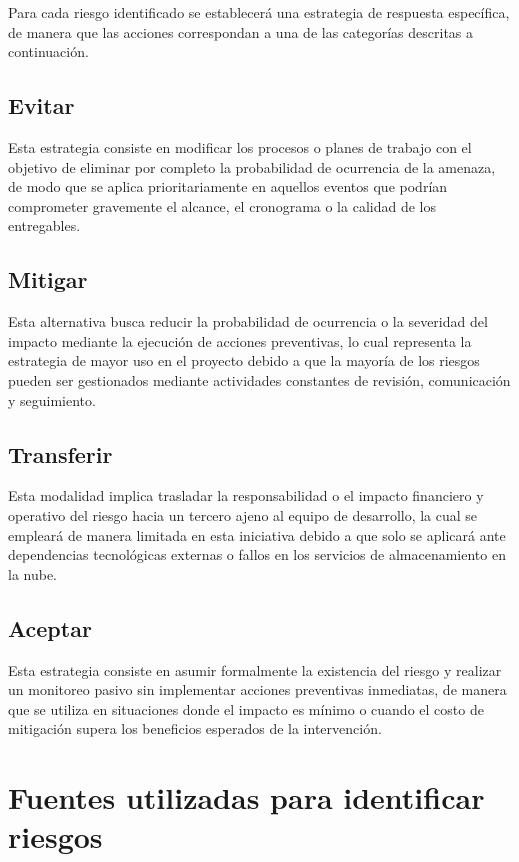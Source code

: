 \documentclass[11pt,spanish]{article}
\begin{document}
Para cada riesgo identificado se establecerá una estrategia de respuesta específica, de manera que las acciones correspondan a una de las categorías descritas a continuación.

\subsection{Evitar}

Esta estrategia consiste en modificar los procesos o planes de trabajo con el objetivo de eliminar por completo la probabilidad de ocurrencia de la amenaza, de modo que se aplica prioritariamente en aquellos eventos que podrían comprometer gravemente el alcance, el cronograma o la calidad de los entregables.

\subsection{Mitigar}

Esta alternativa busca reducir la probabilidad de ocurrencia o la severidad del impacto mediante la ejecución de acciones preventivas, lo cual representa la estrategia de mayor uso en el proyecto debido a que la mayoría de los riesgos pueden ser gestionados mediante actividades constantes de revisión, comunicación y seguimiento.

\subsection{Transferir}

Esta modalidad implica trasladar la responsabilidad o el impacto financiero y operativo del riesgo hacia un tercero ajeno al equipo de desarrollo, la cual se empleará de manera limitada en esta iniciativa debido a que solo se aplicará ante dependencias tecnológicas externas o fallos en los servicios de almacenamiento en la nube.

\subsection{Aceptar}

Esta estrategia consiste en asumir formalmente la existencia del riesgo y realizar un monitoreo pasivo sin implementar acciones preventivas inmediatas, de manera que se utiliza en situaciones donde el impacto es mínimo o cuando el costo de mitigación supera los beneficios esperados de la intervención.

\section{Fuentes utilizadas para identificar riesgos}
\end{document}
